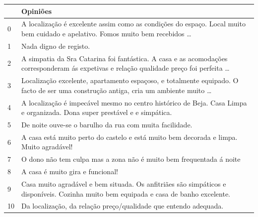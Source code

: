 \documentclass[a4paper,10pt]{article}
\begin{document}
\begin{table}[!ht]
  \centering
  \begin{adjustbox}{width=\columnwidth,center}
    \begin{tabular}{|l|l|}
      \hline
      ~     & Opiniões                                                                                                                                     \\ \hline
      0     & A localização é excelente assim como as condições do espaço. Local muito bem cuidado e apelativo. Fomos muito bem recebidos \dots            \\ \hline
      1     & Nada digno de registo.                                                                                                                       \\ \hline
      2     & A simpatia da Sra Catarina foi fantástica. A casa e as acomodações corresponderam ás expetivas e relação qualidade preço foi perfeita \ldots \\ \hline
      3     & Localização excelente, apartamento espaçoso, e totalmente equipado.
      O facto de ser uma construção antiga, cria um ambiente muito \ldots                                                                                  \\ \hline
      4     & A localização é impecável mesmo no centro histórico de Beja. Casa Limpa e organizada. Dona super prestável e e simpática.                    \\ \hline
      5     & De noite ouve-se o barulho da rua com muita facilidade.                                                                                      \\ \hline
      6     & A casa está muito perto do castelo e está muito bem decorada e limpa. Muito agradável!                                                       \\ \hline
      7     & O dono não tem culpa mas a zona não é muito bem frequentada á noite                                                                          \\ \hline
      8     & A casa é muito gira e funcional!                                                                                                             \\ \hline
      9     & Casa muito agradável e bem situada.  Os anfitriães são simpáticos e disponíveis. Cozinha muito bem equipada e casa de banho excelente.       \\ \hline
      10    & Da localização, da relação preço/qualidade que entendo adequada.                                                                             \\ \hline

\end{tabular}
\end{adjustbox}
\end{table}
\end{document}
